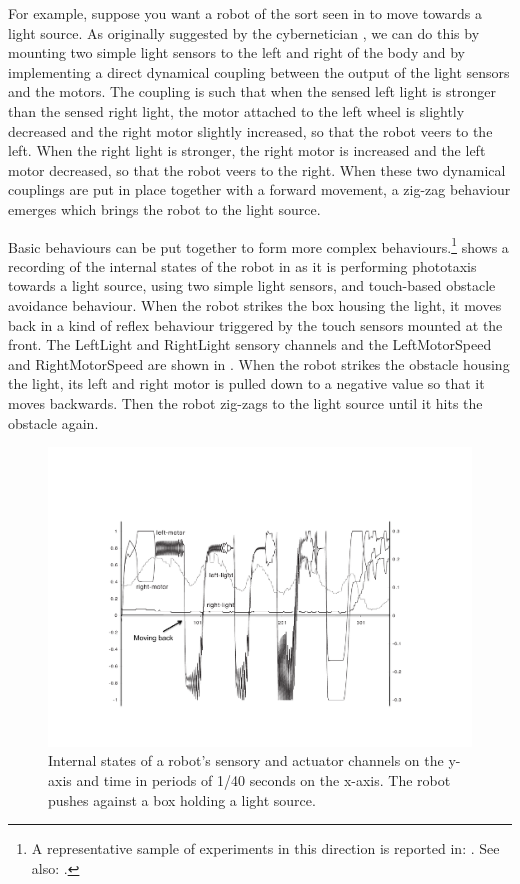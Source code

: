 For example, suppose you want a robot of the sort seen 
in  to move towards a light source. As originally 
suggested by the cybernetician \cite{Braitenberg:1984}, 
we can do this by mounting two simple light sensors 
to the left and right of the body and by implementing a 
direct dynamical coupling between the output of the light
sensors and the motors. The coupling is such that when
the sensed left light is stronger than the sensed right
light, the motor attached
to the left wheel is slightly decreased and the right
motor slightly increased, so that the robot veers to the left. 
When the right light is stronger, the right motor is 
increased and the left motor decreased, so that the 
robot veers to the right. When these two dynamical 
couplings are put in place together with a
forward movement, a zig-zag behaviour emerges which
brings the robot to the light source. 

Basic behaviours can be put together to form 
more complex behaviours.\footnote{A representative sample of experiments in this 
direction is reported in: \cite{Steels:1996}. See 
also: \cite{Arkin:1998}.}
shows a recording of the internal states of the robot
in  as it is performing 
phototaxis towards a light source, using two simple
light sensors, and touch-based obstacle avoidance
behaviour.  When the robot strikes the box housing 
the light, it moves back in a kind of reflex behaviour
triggered by the touch sensors mounted at the front. 
The LeftLight and 
RightLight sensory channels and the LeftMotorSpeed
and RightMotorSpeed are shown 
in . When the robot strikes
the obstacle housing the light, its left and right
motor is pulled down to a negative value so that 
it moves backwards. Then the robot zig-zags to the 
light source until it hits the obstacle again. 

\begin{figure}[htbp]
  \centerline{\includegraphics[width=\textwidth]{chap3/figs/phototaxis.pdf}}
\caption{\label{phototaxis}Internal states of a robot's sensory and actuator channels on 
the y-axis and time in periods of 1/40 seconds on the x-axis.
The robot pushes against a box holding a light source.}
\end{figure}

